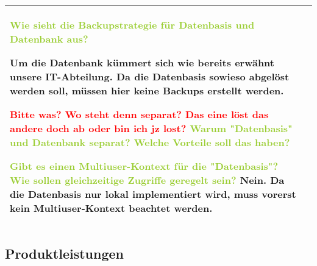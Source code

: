 \begin{center}
\begin{tabular}[ht] {l | p{13cm}}
        \textcolor{YellowGreen}{Wie sieht die Backupstrategie für Datenbasis und Datenbank aus?}

        \textcolor{NavyBlue}{Um die Datenbank kümmert sich wie bereits erwähnt unsere IT-Abteilung. Da die Datenbasis sowieso abgelöst werden soll, müssen hier keine Backups erstellt werden.}

        \textcolor{Red}{Bitte was? Wo steht denn separat? Das eine löst das andere doch ab oder bin ich jz lost?}
        \textcolor{YellowGreen}{Warum "Datenbasis" und Datenbank separat? Welche Vorteile soll das haben?}

        \textcolor{YellowGreen}{Gibt es einen Multiuser-Kontext für die "Datenbasis"? Wie sollen gleichzeitige Zugriffe geregelt sein?}
        \textcolor{NavyBlue}{Nein. Da die Datenbasis nur lokal implementiert wird, muss vorerst kein Multiuser-Kontext beachtet werden.}
        \\
        \hline
        
    \end{tabular}
\end{center}

\subsection{Produktleistungen}

